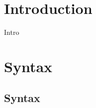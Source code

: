 \documentclass[sigconf,usenames,dvipsnames,svgnames,table]{acmart}
\begin{document}


\maketitle

\section{Introduction}
\sysname Intro
\cite{2011gem5sim}
\cite{2019stt}

  \section {Syntax}
    \subsection{Syntax}\label{sec:spec:synt}
\end{document}
